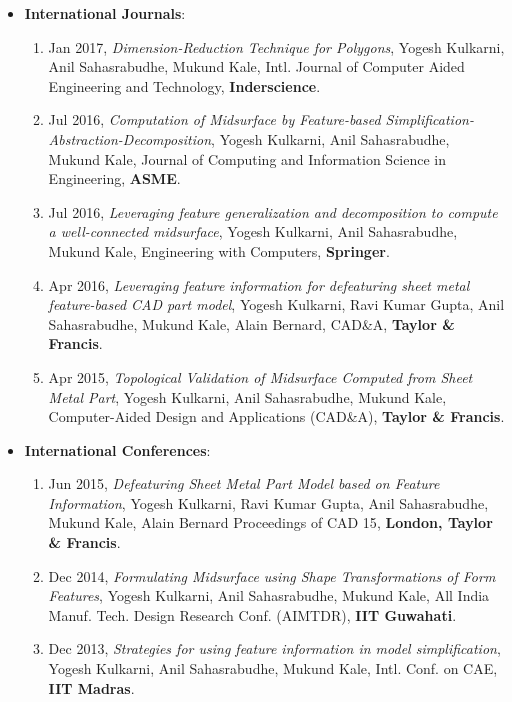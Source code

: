 
\begin{itemize}[noitemsep,label=\textbullet, topsep=2pt,parsep=2pt,partopsep=2pt]
\item  \textbf{International Journals}:
	\begin{enumerate} [noitemsep, topsep=2pt,parsep=2pt,partopsep=2pt]
	\item {Jan 2017}, \textit{Dimension-Reduction Technique for Polygons}, {Yogesh Kulkarni, Anil Sahasrabudhe, Mukund Kale}, {Intl. Journal of Computer Aided Engineering and Technology}, \textbf{Inderscience}.
	\item 	{Jul 2016}, \textit{Computation of Midsurface by Feature-based Simplification-Abstraction-Decomposition}, {Yogesh Kulkarni, Anil Sahasrabudhe, Mukund Kale}, {Journal of Computing and Information Science in Engineering}, \textbf{ASME}.
	\item 	{Jul 2016}, \textit{Leveraging feature generalization and decomposition to compute a well-connected midsurface}, {Yogesh Kulkarni, Anil Sahasrabudhe, Mukund Kale}, {Engineering with Computers}, \textbf{Springer}.
	\item 	{Apr 2016}, \textit{Leveraging feature information for defeaturing sheet metal feature-based CAD part model}, {Yogesh Kulkarni, Ravi Kumar Gupta, Anil Sahasrabudhe, Mukund Kale, Alain Bernard}, {CAD\&A}, \textbf{Taylor \& Francis}.
	\item 	{Apr 2015}, \textit{Topological Validation of Midsurface Computed from Sheet Metal Part}, {Yogesh Kulkarni, Anil Sahasrabudhe, Mukund Kale}, {Computer-Aided Design and Applications (CAD\&A)}, \textbf{Taylor \& Francis}.	
	\end{enumerate}
\item  \textbf{International Conferences}:
	\begin{enumerate}[noitemsep, topsep=2pt,parsep=2pt,partopsep=2pt]
	\item 	{Jun 2015}, \textit{Defeaturing Sheet Metal Part Model based on Feature Information}, {Yogesh Kulkarni, Ravi Kumar Gupta, Anil Sahasrabudhe, Mukund Kale, Alain Bernard} {Proceedings of CAD 15}, \textbf{London, Taylor \& Francis}.
	\item 	{Dec 2014}, \textit{Formulating Midsurface using Shape Transformations of Form Features},	{Yogesh Kulkarni, Anil Sahasrabudhe, Mukund Kale}, {All India Manuf. Tech. Design Research Conf. (AIMTDR)}, \textbf{IIT Guwahati}.
	\item  	{Dec 2013}, \textit{Strategies for using feature information in model simplification}, {Yogesh Kulkarni, Anil Sahasrabudhe, Mukund Kale}, {Intl. Conf. on CAE}, \textbf{IIT Madras}.	

\end{enumerate}
\end{itemize}

